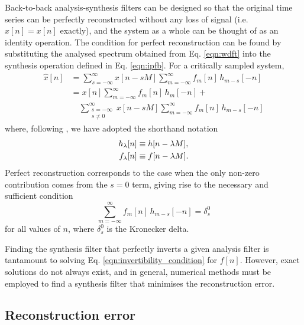 \documentclass{pasa}%
\newcommand{\Kron}{\delta_s^0}
\begin{document}
Back-to-back analysis-synthesis filters can be designed so that the original time series can be perfectly reconstructed without any loss of signal (i.e. $\hat{x}[n] = x[n]$ exactly), and the system as a whole can be thought of as an identity operation.
The condition for perfect reconstruction can be found by substituting the analysed spectrum obtained from Eq. \eqref{eqn:wdft} into the synthesis operation defined in Eq. \eqref{eqn:ipfb}.
For a critically sampled system,
\begin{equation}
    \begin{aligned}
        \hat{x}[n]
            &= \sum_{s = -\infty}^{\infty} x[n - sM]
               \sum_{m = -\infty}^{\infty} f_m[n]\, h_{m-s}[-n] \\
            &= x[n] \sum_{m = -\infty}^{\infty} f_m[n]\, h_m[-n] +{} \\
            &\quad \sum_{\substack{s = -\infty \\ s \ne 0}}^{\infty} x[n - sM]
               \sum_{m = -\infty}^{\infty} f_m[n]\, h_{m-s}[-n]
    \end{aligned}
    \label{eqn:backtoback}
\end{equation}
where, following \citet{Crochiere1983}, we have adopted the shorthand notation
\begin{equation}
    \begin{aligned}
        h_\lambda[n] &\equiv h[n - \lambda M], \\
        f_\lambda[n] &\equiv f[n - \lambda M].
    \end{aligned}
    \notag
\end{equation}
Perfect reconstruction corresponds to the case when the only non-zero contribution comes from the $s = 0$ term, giving rise to the necessary and sufficient condition
\begin{equation}
    \sum_{m = -\infty}^{\infty} f_m[n]\,h_{m-s}[-n] = \Kron
    \label{eqn:invertibility_condition}
\end{equation}
for all values of $n$, where $\Kron$ is the Kronecker delta.

Finding the synthesis filter that perfectly inverts a given analysis filter is tantamount to solving Eq. \eqref{eqn:invertibility_condition} for $f[n]$.
However, exact solutions do not always exist, and in general, numerical methods must be employed to find a synthesis filter that minimises the reconstruction error.

\subsection{Reconstruction error}
\end{document}
